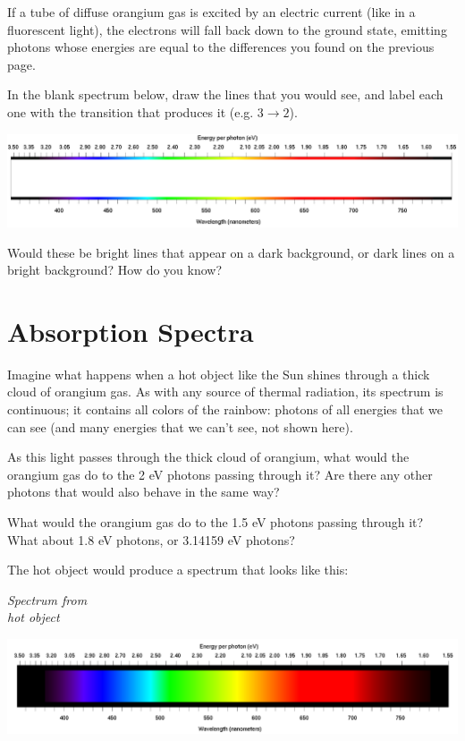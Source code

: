 \documentclass[12pt]{article}
\newcommand{\BC}{\begin{center}}
\newcommand{\EC}{\end{center}}
\begin{document}
\newpage


If a tube of diffuse orangium gas is excited by an electric current (like in a fluorescent light), the electrons will fall back down to the ground state, emitting photons whose energies are equal to the differences you found on the previous page. 

In the blank spectrum below, draw the lines that you would see, and label each one with the transition that produces it (e.g. $3 \rightarrow 2$).

\BC
\includegraphics[width=7in]{spectrum-blank.png}
\EC

Would these be bright lines that appear on a dark background, or dark lines on a bright background? How do you know?

\vspace{1.2in}

\section{Absorption Spectra}

Imagine what happens when a hot object like the Sun shines through a thick cloud of orangium gas. As with any source of thermal radiation, its spectrum is continuous; it contains all colors of the rainbow: photons of all energies that we can see (and many energies that we can't see, not shown here).

As this light passes through the thick cloud of orangium, what would the orangium gas do to the 2 eV photons passing through it? Are there any other photons that would also behave in the same way?

\vspace{1in}

What would the orangium gas do to the 1.5 eV photons passing through it? What about 1.8 eV photons, or 3.14159 eV photons?

\vspace{0.5in}

\newpage


 The hot object would produce a spectrum that looks like this:

\begin{minipage}{0.15\textwidth}
	\begin{center}	\it Spectrum from\\
		hot object\end{center}
\end{minipage}
\begin{minipage}{0.8\textwidth}
	\includegraphics[width=5.5in]{spectrum-continuous.png}
\end{minipage}
\end{document}
